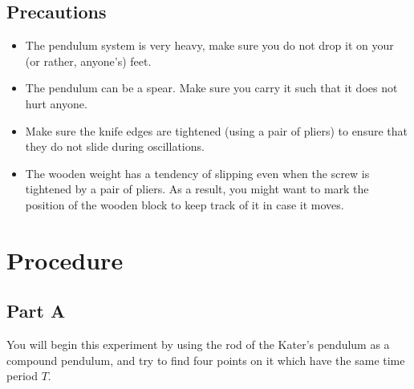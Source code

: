 \subsection*{Precautions}
\begin{itemize}
\itemsep0em
    \item The pendulum system is very heavy, make sure you do not drop it on your (or rather, anyone's) feet.
    
    \item The pendulum can be a spear. Make sure you carry it such that it does not hurt anyone.
    
    \item Make sure the knife edges are tightened (using a pair of pliers) to ensure that they do not slide during oscillations.
    
    \item The wooden weight has a tendency of slipping even when the screw is tightened by a pair of pliers. As a result, you might want to mark the position of the wooden block to keep track of it in case it moves. 
\end{itemize}


\section*{Procedure}

\subsection*{Part A}

You will begin this experiment by using the rod of the Kater's pendulum as a compound pendulum, and try to find four points on it which have the same time period $T$.


